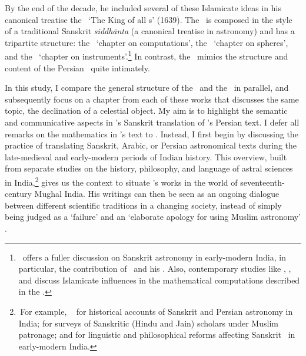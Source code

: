 By the end of the decade, he included several of these Islamicate ideas in his canonical treatise the \Sarvasiddhantaraja\ `The King of all \Siddhanta s' (1639). The \Sarvasiddhantaraja\ is composed in the style of a traditional Sanskrit \textit{siddhānta} (a canonical treatise in astronomy) and has a tripartite structure: the \ganitadhyaya\ `chapter on computations', the \goladhyaya\ `chapter on spheres', and the \yantradhyaya\ `chapter on instruments'.\footnote{\,\textcite[Sections~1.1 and 1.2 on pp.--20]{Misrathesis} offers a fuller discussion on Sanskrit astronomy in early-modern India, in particular, the contribution of \Nityananda\ and his \Sarvasiddhantaraja. Also, contemporary studies like \textcite{PingreeSSR}, \textcite{MonetelleSine1}, and \textcite{MonetelleSine2} discuss Islamicate influences in the mathematical computations described in the \Sarvasiddhantaraja.} In contrast, the \Siddhantasindhu\ mimics the structure and content of the Persian \ZijiShahJahani\ quite intimately. 

In this study, I compare the general structure of the \ZijiShahJahani\ and the \Siddhantasindhu\ in parallel, and subsequently focus on a chapter from each of these works that discusses the same topic, \viz the declination of a celestial object. My aim is to highlight the semantic and communicative aspects in \Nityananda's Sanskrit translation of \MullaFarid's Persian text. I defer all remarks on the mathematics in \Nityananda's text to \textcite[forthcoming]{MisraTD}. Instead, I first begin by discussing the practice of translating Sanskrit, Arabic, or Persian astronomical texts during the late-medieval and early-modern periods of Indian history. This overview, built from separate studies on the history, philosophy, and language of astral sciences in India,\footnote{\,For example, \vid\ \textcites{PingreeIslamAstSkt, PingreeIndianReception, Ansaritransmission, Ansarihindu, Ohasi} for historical accounts of Sanskrit and Persian astronomy in India; \textcites{Choudhuri, Minkowskilearnedbrahmin} for surveys of Sanskritic (Hindu and Jain) scholars under Muslim patronage; and \textcite{Truschke, Minkowski, MinkowskiSuryadasa, Nair} for linguistic and philosophical reforms affecting Sanskrit \jyotihsastra\ in early-modern India.} gives us the context to situate \Nityananda's works in the world of seventeenth-century Mughal India. His writings can then be seen as an ongoing dialogue between different scientific traditions in a changing society, instead of simply being judged as a `failure' and an `elaborate apology for using Muslim astronomy' \parencite[270]{PingreeSSR}. 


